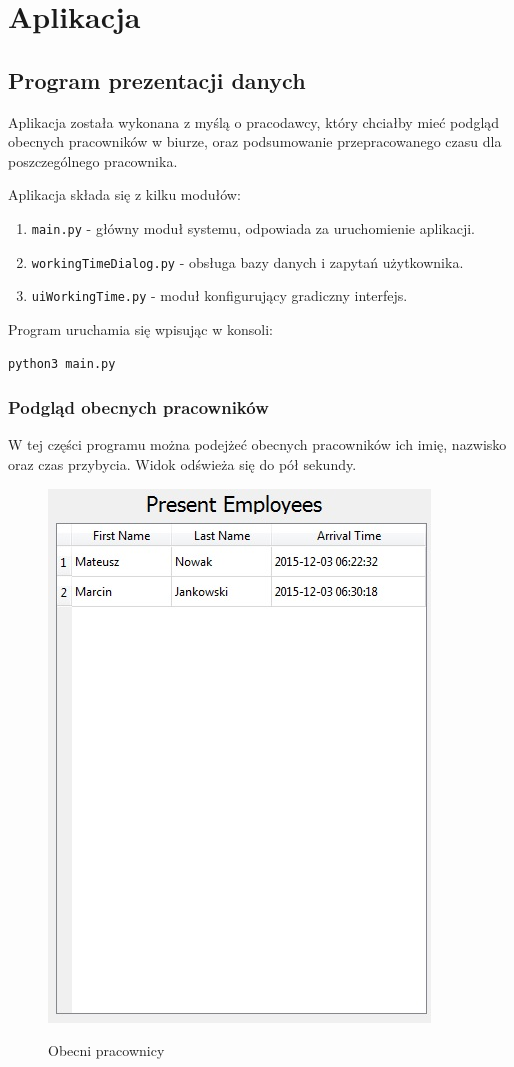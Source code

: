 \chapter{Aplikacja}
\section{Program prezentacji danych}
Aplikacja została wykonana z myślą o pracodawcy, który chciałby mieć podgląd obecnych pracowników w biurze, oraz podsumowanie przepracowanego czasu dla poszczególnego pracownika.

Aplikacja składa się z kilku modułów:

\begin{enumerate}
  \item \texttt{main.py} - główny moduł systemu, odpowiada za uruchomienie aplikacji.
  \item \texttt{workingTimeDialog.py} - obsługa bazy danych i zapytań użytkownika.
  \item \texttt{uiWorkingTime.py} - moduł konfigurujący gradiczny interfejs.
\end{enumerate}

Program uruchamia się wpisując w konsoli:

\begin{verbatim}
python3 main.py
\end{verbatim}
\newpage
\subsection{Podgląd obecnych pracowników}
W tej części programu można podejżeć obecnych pracowników ich imię, nazwisko oraz czas przybycia.
Widok odświeża się do pół sekundy.

\begin{figure}[h!]
	\centering
	\includegraphics[width=0.37\linewidth]{img/present_employees.jpg}
	\label{fig:present_employees}
	\caption[Obecni pracownicy]{Obecni pracownicy}
\end{figure}

